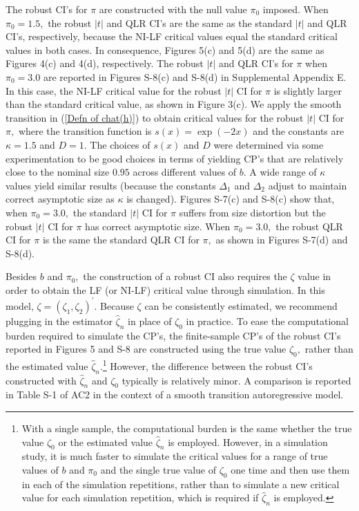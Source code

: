 \documentclass[12pt,thmsb,titlepage,final,oneside,letterpaper]{article}
\begin{document}
The robust CI's for $\pi $ are constructed with the null value $\pi _{0}$
imposed. When $\pi _{0}=1.5,$ the robust $|t|$ and QLR CI's are the same as
the standard $|t|$ and QLR CI's, respectively, because the NI-LF critical
values equal the standard critical values in both cases. In consequence,
Figures 5(c) and 5(d) are the same as Figures 4(c) and 4(d), respectively.
The robust $|t|$ and QLR CI's for $\pi $ when $\pi _{0}=3.0$ are reported in
Figures S-8(c) and S-8(d) in Supplemental Appendix E. In this case, the
NI-LF critical value for the robust $|t|$ CI for $\pi $ is slightly larger
than the standard critical value, as shown in Figure 3(c). We apply the
smooth transition in (\ref{Defn of chat(h)}) to obtain critical values for
the robust $|t|$ CI for $\pi ,$ where the transition function is $s(x)=\exp
(-2x)$ and the constants are $\kappa =1.5$ and $D=1.$ The choices of $s(x)$
and $D$ were determined via some experimentation to be good choices in terms
of yielding CP's that are relatively close to the nominal size $0.95$ across
different values of $b.$ A wide range of $\kappa $ values yield similar
results (because the constants $\Delta _{1}$ and $\Delta _{2}$ adjust to
maintain correct asymptotic size as $\kappa $ is changed). Figures S-7(c)
and S-8(c) show that, when $\pi _{0}=3.0,$ the standard $|t|$ CI for $\pi $
suffers from size distortion but the robust $|t|$ CI for $\pi $ has correct
asymptotic size. When $\pi _{0}=3.0,$ the robust QLR CI for $\pi $ is the
same the standard QLR CI for $\pi ,$ as shown in Figures S-7(d) and S-8(d).

Besides $b$ and $\pi _{0},$ the construction of a robust CI also requires
the $\zeta $ value in order to obtain the LF (or NI-LF) critical value
through simulation. In this model, $\zeta =(\zeta _{1},\zeta _{2})^{\prime
}. $ Because $\zeta $ can be consistently estimated, we recommend plugging
in the estimator $\widehat{\zeta }_{n}$ in place of $\zeta _{0}$ in
practice. To ease the computational burden required to simulate the CP's,
the finite-sample CP's of the robust CI's reported in Figures 5 and S-8 are
constructed using the true value $\zeta _{0},$ rather than the estimated
value $\widehat{\zeta }_{n}.$\footnote{%
With a single sample, the computational burden is the same whether the true
value $\zeta _{0}$ or the estimated value $\widehat{\zeta }_{n}$ is
employed. However, in a simulation study, it is much faster to simulate the
critical values for a range of true values of $b$ and $\pi _{0}$ and the
single true value of $\zeta _{0}$ one time and then use them in each of the
simulation repetitions, rather than to simulate a new critical value for
each simulation repetition, which is required if $\widehat{\zeta }_{n}$ is
employed.} However, the difference between the robust CI's constructed with $%
\widehat{\zeta }_{n}$ and $\zeta _{0}$ typically is relatively minor. A
comparison is reported in Table S-1 of AC2 in the context of a smooth
transition autoregressive model.
\end{document}

